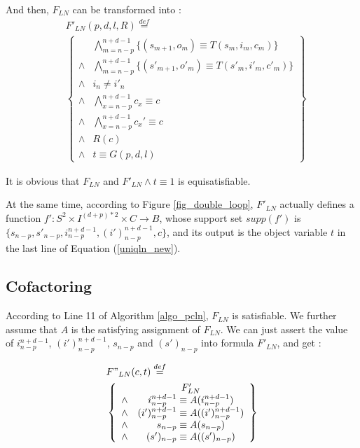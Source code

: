 \documentclass{acm_proc_article-sp}
\begin{document}
And then,
$F_{LN}$ can be transformed into :
\begin{equation}\label{uniqln_new}
\begin{split}
&F'_{LN}(p,d,l,R)\stackrel{def}{=}\\
&\left\{
\begin{array}{cc}
&\bigwedge_{m=n-p}^{n+d-1}
\{
(s_{m+1},o_m)\equiv T(s_m,i_m,c_m)
\}
\\
\wedge&\bigwedge_{m=n-p}^{n+d-1}
\{
(s'_{m+1},o'_m)\equiv T(s'_m,i'_m,c'_m)
\}
\\
\wedge& i_n\ne i'_n \\
\wedge&\bigwedge_{x=n-p}^{n+d-1}c_x\equiv c \\
\wedge&\bigwedge_{x=n-p}^{n+d-1}c_x'\equiv c \\
\wedge& R(c) \\
\wedge& t\equiv G(p,d,l)
\end{array}
\right\}
\end{split}
\end{equation}

It is obvious that $F_{LN}$ and $F'_{LN}\wedge t\equiv 1$ is equisatisfiable.

At the same time,
according to Figure \ref{fig_double_loop},
$F'_{LN}$ actually defines a function $f':S^{2}\times I^{(d+p)*2}\times C\to B$,
whose support set $supp(f')$ is $\{s_{n-p},s'_{n-p},i_{n-p}^{n+d-1},(i')_{n-p}^{n+d-1},c\}$,
and its output is the object variable $t$ in the last line of Equation (\ref{uniqln_new}).

\subsection{Cofactoring}
According to Line 11 of Algorithm \ref{algo_pcln},
$F_{LN}$ is satisfiable.
We further assume that $A$ is the satisfying assignment of $F_{LN}$.
We can just assert the value of $i_{n-p}^{n+d-1}$, $(i')_{n-p}^{n+d-1}$, $s_{n-p}$ and $(s')_{n-p}$ into formula $F'_{LN}$,
and get :

\begin{equation}\label{equ_char}
\begin{split}
&F"_{LN}(c,t)\stackrel{def}{=}\\
&\left\{
\begin{array}{cc}
& F'_{LN}\\
\wedge& i_{n-p}^{n+d-1}\equiv A(i_{n-p}^{n+d-1})\\
\wedge& (i')_{n-p}^{n+d-1}\equiv A((i')_{n-p}^{n+d-1})\\
\wedge& s_{n-p}\equiv A(s_{n-p})\\
\wedge& (s')_{n-p}\equiv A((s')_{n-p})
\end{array}
\right\}
\end{split}
\end{equation}
\end{document}
